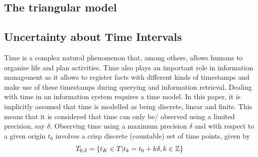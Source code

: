 % 
% 
% 
% 
% 
% 
% 
% 

\subsection{\label{subsec:triangular-model}The triangular model}

\subsection{\label{subsec:uncertainty-about-time-intervals}Uncertainty about Time Intervals}
Time is a complex natural phenomenon that, among others, allows humans to organise life and plan activities. Time also plays an important role in information management as it allows to register facts with different kinds of timestamps and make use of these timestamps during querying and information retrieval. Dealing with time in an information system requires a time model. In this paper, it is implicitly assumed that time is modelled as being discrete, linear and finite. This means that it is considered that time can only be/ observed using a limited precision, say $\delta$. Observing time using a maximum precision $\delta$ and with respect to a given origin $t_0$ involves a crisp discrete (countable) set of time points, given by
\begin{equation}
 \label{eq:t0-delta}
T_{0,\delta} = \lbrace t_K \in T | t_k = t_0 + k\delta, k \in \mathbb{Z} \rbrace
\end{equation}

